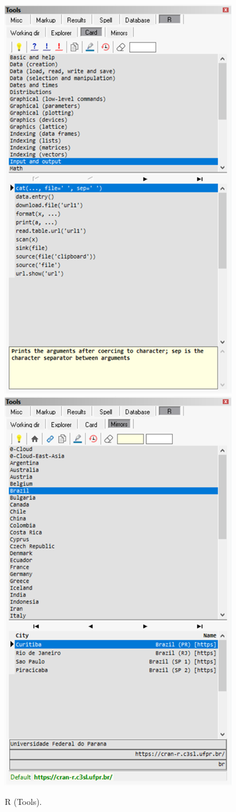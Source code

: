 \begin{figure}[H]
  \includegraphics[scale=0.6]{./res/tools_r_card.png}~~
  \includegraphics[scale=0.6]{./res/tools_r_mirrors.png}\\
  \caption{R (Tools).}
  \label{fig:tools_r}
\end{figure}
